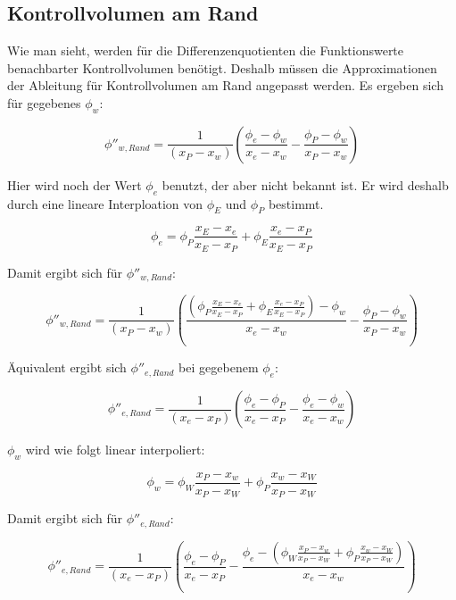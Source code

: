 \documentclass[10pt, ngerman,colorback,accentcolor=tud2d]{tudreport}
\begin{document}
\subsection{Kontrollvolumen am Rand}

Wie man sieht, werden für die Differenzenquotienten die Funktionswerte benachbarter
Kontrollvolumen benötigt. Deshalb müssen die Approximationen der Ableitung für
Kontrollvolumen am Rand angepasst werden. Es ergeben sich für gegebenes $\phi_w$:

\begin{equation*}
  \phi''_{w, Rand} = \frac{1}{(x_P-x_w)}\left({
\frac{\phi_{e}-\phi_w}{x_{e}-x_w}-\frac{\phi_P-\phi_w}{x_P-x_w}}\right)
\end{equation*}

Hier wird noch der Wert $\phi_e$ benutzt, der aber nicht bekannt ist. Er wird deshalb
durch eine lineare Interploation von $\phi_E$ und $\phi_P$ bestimmt.

\begin{equation}
  \phi_e = \phi_P \frac{x_E-x_e}{x_E-x_P} + \phi_E \frac{x_e-x_P}{x_E-x_P}
\end{equation}

Damit ergibt sich für $\phi''_{w,Rand}$:

\begin{equation}
  \phi''_{w,Rand}  = \frac{1}{(x_P-x_w)}\left({
\frac{
  \left({\phi_P \frac{x_E-x_e}{x_E-x_P} + \phi_E \frac{x_e-x_P}{x_E-x_P}
}\right)
-\phi_w}{x_{e}-x_w}-\frac{\phi_P-\phi_w}{x_P-x_w}}\right)
\end{equation}

Äquivalent ergibt sich $\phi''_{e, Rand}$ bei gegebenem $\phi_e$:

\begin{equation*}
  \phi''_{e, Rand} = \frac{1}{(x_e-x_P)}\left({
\frac{\phi_{e}-\phi_P}{x_{e}-x_P}-\frac{\phi_e-\phi_w}{x_e-x_w}}\right)
\end{equation*}

$\phi_w$ wird wie folgt linear interpoliert:

\begin{equation*}
  \phi_w = \phi_W \frac{x_P-x_w}{x_P-x_W} + \phi_P \frac{x_w-x_W}{x_P-x_W}
\end{equation*}

Damit ergibt sich für $\phi''_{e,Rand}$:

\begin{equation}
  \phi''_{e,Rand} = \frac{1}{(x_e-x_P)}\left({
\frac{\phi_{e}-\phi_P}{x_{e}-x_P}-\frac{\phi_e-
  \left({
   \phi_W \frac{x_P-x_w}{x_P-x_W} + \phi_P \frac{x_w-x_W}{x_P-x_W}
  }\right)
}{x_e-x_w}}\right)
\end{equation}
\end{document}
